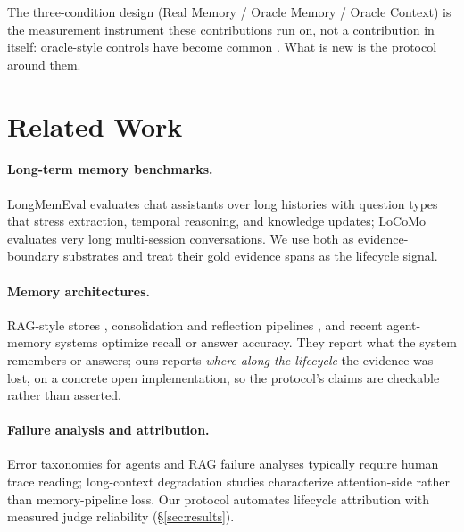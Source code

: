 \documentclass[11pt]{article}
\begin{document}
The three-condition design (Real Memory / Oracle Memory / Oracle Context)
is the measurement instrument these contributions run on, not a
contribution in itself: oracle-style controls have become common
\cite{memtrace,memtier}. What is new is the protocol around them.
\section{Related Work}

\paragraph{Long-term memory benchmarks.} LongMemEval \cite{longmemeval} evaluates
chat assistants over long histories with question types that stress
extraction, temporal reasoning, and knowledge updates; LoCoMo
\cite{locomo} evaluates very long multi-session conversations. We use both as
evidence-boundary substrates and treat their gold evidence spans as the
lifecycle signal.

\paragraph{Memory architectures.} RAG-style stores \cite{retrieval-augmented-generation,bm25},
consolidation and reflection pipelines \cite{generative-agents,memgpt,reflexion},
and recent agent-memory systems \cite{mem0,mnemonic,memobase} optimize recall
or answer accuracy. They report what the system remembers or answers;
ours reports \emph{where along the lifecycle} the evidence was lost, on a
concrete open implementation, so the protocol's claims are checkable
rather than asserted.

\paragraph{Failure analysis and attribution.} Error taxonomies for agents
and RAG failure analyses \cite{survey-memory-agents} typically require
human trace reading; long-context degradation studies
\cite{lost-in-middle} characterize attention-side rather than
memory-pipeline loss. Our protocol automates lifecycle attribution with
measured judge reliability (\S\ref{sec:results}).
\end{document}
